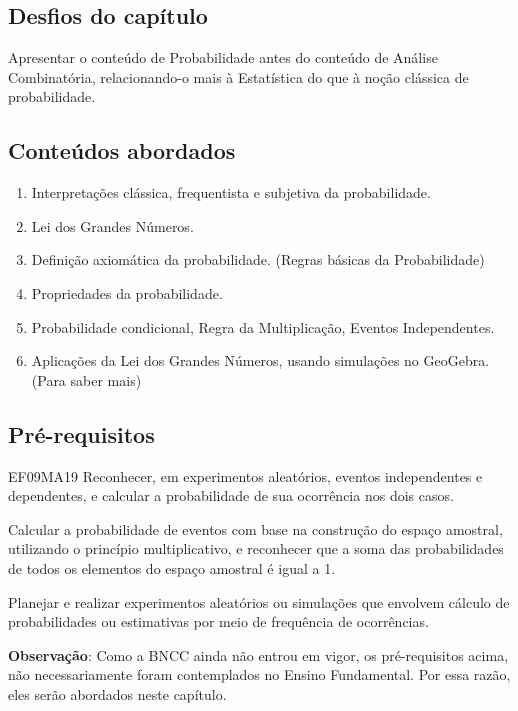 \begin{apresentacao}
\subsection{Desfios do capítulo}
Apresentar o conteúdo de Probabilidade antes do conteúdo de Análise Combinatória, relacionando-o mais à Estatística do que à noção clássica de probabilidade.

\subsection{Conteúdos abordados}
\begin{enumerate}
\item Interpretações clássica, frequentista e subjetiva da probabilidade.
\item Lei dos Grandes Números.
\item Definição axiomática da probabilidade. (Regras básicas da Probabilidade)
\item Propriedades da probabilidade.
\item Probabilidade condicional, Regra da Multiplicação, Eventos Independentes.
\item Aplicações da Lei dos Grandes Números, usando simulações no GeoGebra.(Para saber mais)
\end{enumerate}

\subsection{Pré-requisitos}
\begin{habilities}{EF09MA19}
Reconhecer, em experimentos aleatórios, eventos independentes e dependentes, e calcular a probabilidade de sua ocorrência nos dois casos.

Calcular a probabilidade de eventos com base na construção do espaço amostral, utilizando o princípio multiplicativo, e reconhecer que a soma das probabilidades de todos os elementos do espaço amostral é igual a 1.

Planejar e realizar experimentos aleatórios ou simulações que envolvem cálculo de probabilidades ou estimativas por meio de frequência de ocorrências.
\end{habilities}

\textbf{Observação}: Como a BNCC ainda não entrou em vigor, os pré-requisitos acima, não necessariamente foram contemplados no Ensino Fundamental. Por essa razão, eles serão abordados neste capítulo.


\end{apresentacao}
